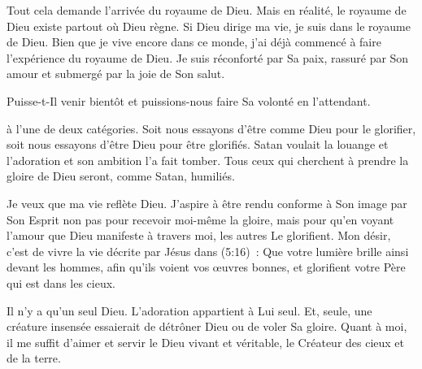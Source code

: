 Tout cela demande l'arrivée du royaume de Dieu.
 Mais en réalité, le royaume de Dieu existe partout où Dieu règne.
 Si Dieu dirige ma vie, je suis dans le royaume de Dieu.
 Bien que je vive encore dans ce monde, j'ai déjà commencé à faire
 l'expérience du royaume de Dieu. Je suis réconforté par Sa paix,
 rassuré par Son amour et submergé par la joie de Son salut. 

Puisse-t-Il venir bientôt
 \ocadr et puissions-nous faire Sa volonté en l'attendant. 

\dvrule






 à l'une de deux catégories.
 Soit nous essayons d'être comme Dieu pour le glorifier,
 soit nous essayons d'être Dieu pour être glorifiés.
 Satan voulait la louange et l'adoration
 \ocadr et son ambition l'a fait tomber.
 Tous ceux qui cherchent à prendre la gloire de Dieu seront,
 comme Satan, humiliés. 


Je veux que ma vie reflète Dieu. J'aspire à être rendu conforme
 à Son image par Son Esprit \ocadr non pas pour recevoir moi-même la gloire,
 mais pour qu'en voyant l'amour que Dieu manifeste à travers moi,
 les autres Le glorifient.
 Mon désir, c'est de vivre la vie décrite par Jésus
 dans (5:16)~:
 \og Que votre lumière brille ainsi devant les hommes,
 afin qu'ils voient vos œuvres bonnes,
 et glorifient votre Père qui est dans les cieux. \fg{}

Il n'y a qu'un seul Dieu. L'adoration appartient à Lui seul.
 Et, seule, 
 une créature insensée essaierait de détrôner Dieu ou de voler Sa gloire.
 Quant à moi, il me suffit d'aimer et servir le Dieu vivant et véritable,
 le Créateur des cieux et de la terre. 

